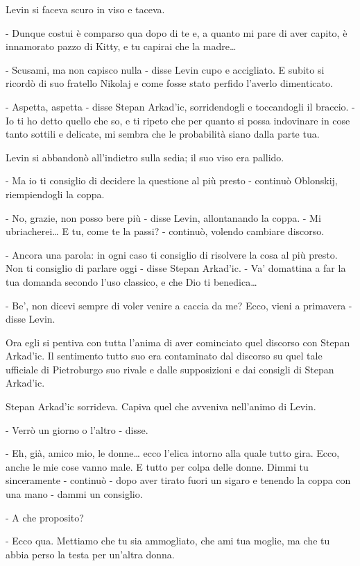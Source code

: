 Levin si faceva scuro in viso e taceva. 

- Dunque costui è comparso qua dopo di te e, a quanto mi pare di aver capito, è innamorato pazzo di Kitty, e tu capirai che la madre\ldots{} 

- Scusami, ma non capisco nulla - disse Levin cupo e accigliato. E subito si ricordò di suo fratello Nikolaj e come fosse stato perfido l'averlo dimenticato. 

- Aspetta, aspetta - disse Stepan Arkad'ic, sorridendogli e toccandogli il braccio. - Io ti ho detto quello che so, e ti ripeto che per quanto si possa indovinare in cose tanto sottili e delicate, mi sembra che le probabilità siano dalla parte tua. 

Levin si abbandonò all'indietro sulla sedia; il suo viso era pallido. 

- Ma io ti consiglio di decidere la questione al più presto - continuò Oblonskij, riempiendogli la coppa. 

- No, grazie, non posso bere più - disse Levin, allontanando la coppa. - Mi ubriacherei\ldots{} E tu, come te la passi? - continuò, volendo cambiare discorso. 

- Ancora una parola: in ogni caso ti consiglio di risolvere la cosa al più presto. Non ti consiglio di parlare oggi - disse Stepan Arkad'ic. - Va' domattina a far la tua domanda secondo l'uso classico, e che Dio ti benedica\ldots{} 

- Be', non dicevi sempre di voler venire a caccia da me? Ecco, vieni a primavera - disse Levin. 

Ora egli si pentiva con tutta l'anima di aver cominciato quel discorso con Stepan Arkad'ic. Il sentimento tutto suo era contaminato dal discorso su quel tale ufficiale di Pietroburgo suo rivale e dalle supposizioni e dai consigli di Stepan Arkad'ic. 

Stepan Arkad'ic sorrideva. Capiva quel che avveniva nell'animo di Levin. 

- Verrò un giorno o l'altro - disse. 

- Eh, già, amico mio, le donne\ldots{} ecco l'elica intorno alla quale tutto gira. Ecco, anche le mie cose vanno male. E tutto per colpa delle donne. Dimmi tu sinceramente - continuò - dopo aver tirato fuori un sigaro e tenendo la coppa con una mano - dammi un consiglio. 

- A che proposito? 

- Ecco qua. Mettiamo che tu sia ammogliato, che ami tua moglie, ma che tu abbia perso la testa per un'altra donna. 

